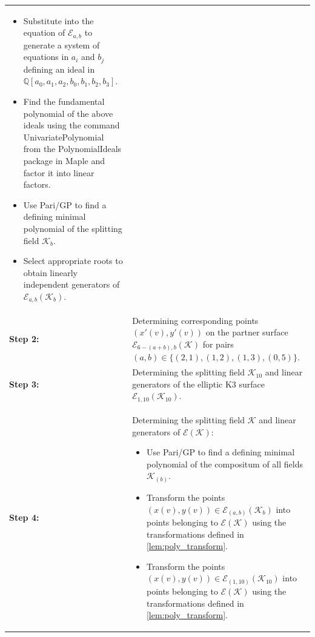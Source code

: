 \documentclass[11pt]{amsart}
\newcommand{\Ee}{{\mathcal E}}
\numberwithin{equation}{section}
\numberwithin{table}{section}
\newcommand\<{\langle}
\begin{document}
\begin{table}[htbp]
\begin{tabularx}{\textwidth}{@{} l X @{}}
\begin{itemize}[leftmargin=*, nosep, topsep=2pt]
			$(x(v), y(v)) = (a_0 + a_1 v + a_2 v^2, b_0 + b_1 v + b_2 v^2 + b_3 v^3)$.
			\item Substitute into the equation of $\mathcal{E}_{a,b}$ to generate a system of equations in $a_i$ and $b_j$ defining an ideal in $\mathbb{Q}[a_0, a_1, a_2, b_0, b_1, b_2, b_3]$.
			\item Find the fundamental polynomial of the above ideals using the command \textsf{UnivariatePolynomial} from the \textsf{PolynomialIdeals} package in \textsf{Maple} and factor it into linear factors.
			\item Use \textsf{Pari/GP} to find a defining minimal polynomial  of the splitting field $\mathcal{K}_{b}$.
			\item Select appropriate roots to obtain linearly independent generators of $\mathcal{E}_{a,b}(\mathcal{K}_{b})$.
		\end{itemize} \\
		\addlinespace
		\textbf{Step 2:} & Determining corresponding points $(x'(v), y'(v))$ on the partner surface 
		$\mathcal{E}_{6-(a+b), b}(\mathcal{K})$ for pairs $(a,b) \in \{ (2, 1), (1,2), (1, 3), (0, 5) \}.$ \\
		\addlinespace
		\textbf{Step 3:} & Determining the splitting field $\mathcal{K}_{10}$ and linear generators of the elliptic K3 surface $\mathcal{E}_{1,10}(\mathcal{K}_{10})$.\\
		\textbf{Step 4:} & Determining the splitting field $\mathcal{K}$ and linear generators of $\mathcal{E}(\mathcal{K})$:
		\begin{itemize}[leftmargin=*, nosep, topsep=2pt]
			\item Use \textsf{Pari/GP} to find a defining minimal polynomial of the compositum of all fields $\mathcal{K}_{(b)}$.
			\item Transform the points $(x(v), y(v)) \in \mathcal{E}_{(a,b)}(\mathcal{K}_{b})$ into points belonging to $\mathcal{E}(\mathcal{K})$ using the transformations defined in \ref{lem:poly_transform}.
				\item Transform the points $(x(v), y(v)) \in \mathcal{E}_{(1,10)}(\mathcal{K}_{10})$ into points belonging to $\mathcal{E}(\mathcal{K})$ using the transformations defined in \ref{lem:poly_transform}.
		\end{itemize} \\
		\bottomrule
	\end{tabularx}
\end{table}

 
 
\iffalse
\end{document}
